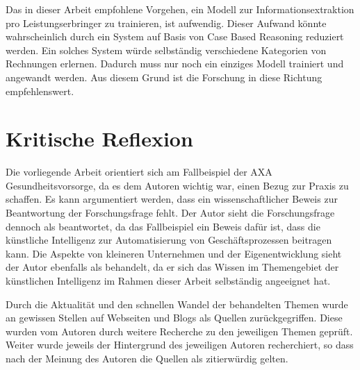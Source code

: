 Das in dieser Arbeit empfohlene Vorgehen, ein Modell zur Informationsextraktion pro Leistungserbringer zu trainieren, ist aufwendig. Dieser Aufwand könnte wahrscheinlich durch ein System auf Basis von Case Based Reasoning reduziert werden. Ein solches System würde selbständig verschiedene Kategorien von Rechnungen erlernen. Dadurch muss nur noch ein einziges Modell trainiert und angewandt werden. Aus diesem Grund ist die Forschung in diese Richtung empfehlenswert.

\section{Kritische Reflexion}
\label{chap:reflexion}

Die vorliegende Arbeit orientiert sich am Fallbeispiel der AXA Gesundheitsvorsorge, da es dem Autoren wichtig war, einen Bezug zur Praxis zu schaffen. Es kann argumentiert werden, dass ein wissenschaftlicher Beweis zur Beantwortung der Forschungsfrage fehlt. Der Autor sieht die Forschungsfrage dennoch als beantwortet, da das Fallbeispiel ein Beweis dafür ist, dass die künstliche Intelligenz zur Automatisierung von Geschäftsprozessen beitragen kann. Die Aspekte von kleineren Unternehmen und der Eigenentwicklung sieht der Autor ebenfalls als behandelt, da er sich das Wissen im Themengebiet der künstlichen Intelligenz im Rahmen dieser Arbeit selbständig angeeignet hat.

Durch die Aktualität und den schnellen Wandel der behandelten Themen wurde an gewissen Stellen auf Webseiten und Blogs als Quellen zurückgegriffen. Diese wurden vom Autoren durch weitere Recherche zu den jeweiligen Themen geprüft. Weiter wurde jeweils der Hintergrund des jeweiligen Autoren recherchiert, so dass nach der Meinung des Autoren die Quellen als zitierwürdig gelten.